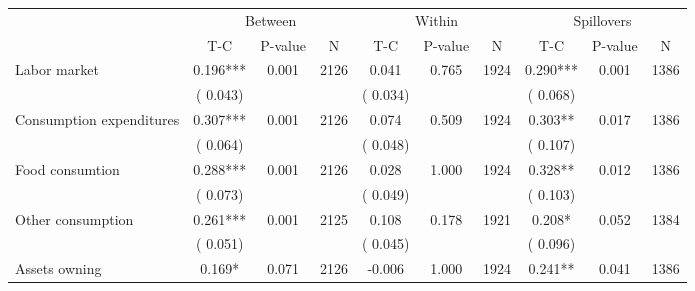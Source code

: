 
\begin{tabular}{l*{9}{c}}\hline&\multicolumn{3}{c}{Between}&\multicolumn{3}{c}{Within}&\multicolumn{3}{c}{Spillovers} \\ \cmidrule(r){2-4}\cmidrule(l){5-7}\cmidrule(l){8-10} & {T-C} & {P-value} & {N} & {T-C} & {P-value} & {N}  & {T-C} & {P-value} & {N}  \\ \midrule
 Labor market                 &              0.196***          &        0.001 & 2126          &              0.041          &        0.765 & 1924          &        0.290*** &        0.001 & 1386                 \\ 
                               &        (       0.043) & &                                                                 &       (       0.034) & &                                                          &       (       0.068)      & &     \\ 
 Consumption expenditures                 &              0.307***          &        0.001 & 2126          &              0.074 &        0.509 & 1924                   &        0.303** &        0.017 & 1386                 \\ 
                               &        (       0.064) & &                                                                 &       (       0.048) & &                                                          &       (       0.107) & &  \\ 
 Food consumtion                 &              0.288***          &        0.001 & 2126          &              0.028 &        1.000 & 1924                   &        0.328** &        0.012 & 1386                 \\ 
                               &        (       0.073) & &                                                                 &       (       0.049) & &                                                          & (       0.103)                                    \\ 
 Other consumption                 &              0.261***          &        0.001 & 2125          &              0.108 &        0.178 & 1921                   &        0.208* &        0.052 & 1384                 \\ 
                               &        (       0.051) & &                                                                 &       (       0.045) & &                                                          &       (       0.096) & &   \\ 
 Assets owning                 &              0.169*          &        0.071 & 2126          &             -0.006 &        1.000 & 1924                   &        0.241** &        0.041 & 1386                 \\ 

\end{tabular}
